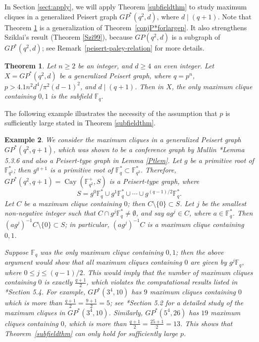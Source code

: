 \documentclass[12pt,reqno]{amsart}
\newtheorem{thm}{Theorem}[section]
\newtheorem{ex}[thm]{Example}
\theoremstyle{definition}
\newcommand{\F}{\mathbb{F}}
\begin{document}
In Section \ref{sect:apply}, we will apply Theorem \ref{subfieldthm} to study maximum cliques in a generalized Peisert graph $GP^*(q^2,d)$, where $d \mid (q+1)$. Note that Theorem \ref{GP*thm} is a generalization of Theorem~\ref{conjP*forlargep}. It also strengthens Sziklai's result (Theorem \ref{Szi99}), because $GP(q^2,d)$ is a subgraph of $GP^{*}(q^2, d)$; see Remark~\ref{peisert-paley-relation} for more details. 

\begin{thm}\label{GP*thm}
Let $n \geq 2$ be an integer, and $d \geq 4$ an even integer. Let $X=GP^*(q^2,d)$ be a generalized Peisert graph, where $q=p^n$,  $p>4.1n^2d^4/\pi^2(d-1)^2$, and $d \mid (q+1)$. Then in $X$, the only maximum clique containing $0,1$ is the subfield $\F_q$.
\end{thm}


The following example illustrates the necessity of the assumption that $p$ is sufficiently large stated in Theorem \ref{subfieldthm}.

\begin{ex}\label{ex:counter-example}\rm
We consider the maximum cliques in a generalized Peisert graph $GP^*(q^2,q+1)$, which was shown to be a conference graph by Mullin \cite{NM}*{Lemma 5.3.6} and also a Peisert-type graph in Lemma \ref{Ptlem}.  Let $g$ be a primitive root of $\F_{q^2}^*$; then $g^{q+1}$ is a primitive root of $\F_{q}^* \subset \F_{q^2}^*$. Therefore, $GP^*(q^2,q+1)=\operatorname{Cay}(\F_{q^2}^+,S)$ is a Peisert-type graph, where
\[
S=g^0 \F_q^* \cup g^1 \F_q^* \cup \cdots \cup g^{(q-1)/2} \F_q^*.
\]
Let $C$ be a maximum clique containing $0$; then $C \setminus \{0\} \subset S$. Let $j$ be the smallest non-negative integer such that $C \cap g^j \F_q^*\neq \emptyset$, and say $ag^j \in C$, where $a \in \F_q^*$. Then $(ag^j)^{-1} C \setminus \{0\} \subset S$; in particular, $(ag^j)^{-1} C$ is a maximum clique containing $0,1$.

Suppose $\F_q$ was the only maximum clique containing $0,1$; then the above argument would show that all maximum cliques containing $0$ are given by $g^j \F_q$, where $0 \leq j \leq (q-1)/2$. This would imply that the number of maximum cliques containing $0$ is exactly $\frac{q+1}{2}$, which violates the computational results listed in \cite{NM}*{Section 5.4}. For example, $GP^*(3^4,10)$ has $9$ maximum cliques containing $0$ which is more than $\frac{q+1}{2}=\frac{9+1}{2}=5$; see \cite{AGLY22}*{Section 5.2} for a detailed study of the maximum cliques in $GP^*(3^4,10)$. Similarly, $GP^*(5^4,26)$ has $19$ maximum cliques containing $0$, which is more than $\frac{q+1}{2}=\frac{25+1}{2}=13$. This shows that Theorem~\ref{subfieldthm} can only hold for sufficiently large $p$.
\end{ex}
\end{document}
